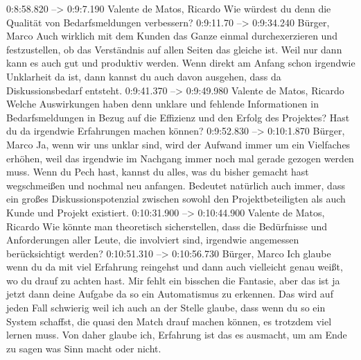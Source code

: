 0:8:58.820 --> 0:9:7.190
Valente de Matos, Ricardo
Wie würdest du denn die Qualität von Bedarfsmeldungen verbessern?
0:9:11.70 --> 0:9:34.240
Bürger, Marco
Auch wirklich mit dem Kunden das Ganze einmal durchexerzieren und festzustellen, ob das Verständnis auf allen Seiten das gleiche ist. Weil nur dann kann es auch gut und produktiv werden. Wenn direkt am Anfang schon irgendwie Unklarheit da ist, dann kannst du auch davon ausgehen, dass da Diskussionsbedarf entsteht.
0:9:41.370 --> 0:9:49.980
Valente de Matos, Ricardo
Welche Auswirkungen haben denn unklare und fehlende Informationen in Bedarfsmeldungen in Bezug auf die Effizienz und den Erfolg des Projektes? Hast du da irgendwie Erfahrungen machen können?
0:9:52.830 --> 0:10:1.870
Bürger, Marco
Ja, wenn wir uns unklar sind, wird der Aufwand immer um ein Vielfaches erhöhen, weil das irgendwie im Nachgang immer noch mal gerade gezogen werden muss. Wenn du Pech hast, kannst du alles, was du bisher gemacht hast wegschmeißen und nochmal neu anfangen. Bedeutet natürlich auch immer, dass ein großes Diskussionspotenzial zwischen sowohl den Projektbeteiligten als auch Kunde und Projekt existiert.
0:10:31.900 --> 0:10:44.900
Valente de Matos, Ricardo
Wie könnte man theoretisch sicherstellen, dass die Bedürfnisse und Anforderungen aller Leute, die involviert sind, irgendwie angemessen berücksichtigt werden?
0:10:51.310 --> 0:10:56.730
Bürger, Marco
Ich glaube wenn du da mit viel Erfahrung reingehst und dann auch vielleicht genau weißt, wo du drauf zu achten hast. Mir fehlt ein bisschen die Fantasie, aber das ist ja jetzt dann deine Aufgabe da so ein Automatismus zu erkennen. Das wird auf jeden Fall schwierig weil ich auch an der Stelle glaube, dass wenn du so ein System schaffst, die quasi den Match drauf machen können, es trotzdem viel lernen muss. Von daher glaube ich, Erfahrung ist das es ausmacht, um am Ende zu sagen was Sinn macht oder nicht.
